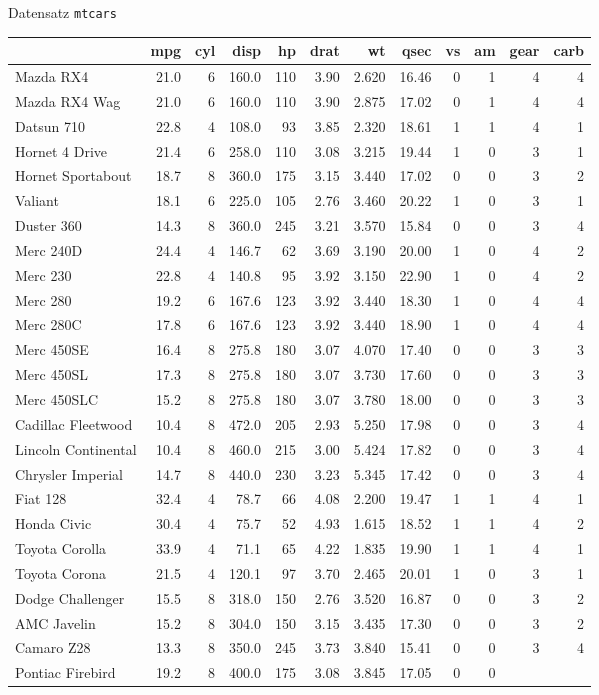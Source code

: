 \documentclass[
  ignorenonframetext,
]{beamer}
\begin{document}
\begin{frame}{Datensatz \texttt{mtcars}}
\protect\hypertarget{datensatz-mtcars}{}

\begin{longtable}[]{@{}lrrrrrrrrrrr@{}}
\toprule
& mpg & cyl & disp & hp & drat & wt & qsec & vs & am & gear &
carb\tabularnewline
\midrule
\endhead
Mazda RX4 & 21.0 & 6 & 160.0 & 110 & 3.90 & 2.620 & 16.46 & 0 & 1 & 4 &
4\tabularnewline
Mazda RX4 Wag & 21.0 & 6 & 160.0 & 110 & 3.90 & 2.875 & 17.02 & 0 & 1 &
4 & 4\tabularnewline
Datsun 710 & 22.8 & 4 & 108.0 & 93 & 3.85 & 2.320 & 18.61 & 1 & 1 & 4 &
1\tabularnewline
Hornet 4 Drive & 21.4 & 6 & 258.0 & 110 & 3.08 & 3.215 & 19.44 & 1 & 0 &
3 & 1\tabularnewline
Hornet Sportabout & 18.7 & 8 & 360.0 & 175 & 3.15 & 3.440 & 17.02 & 0 &
0 & 3 & 2\tabularnewline
Valiant & 18.1 & 6 & 225.0 & 105 & 2.76 & 3.460 & 20.22 & 1 & 0 & 3 &
1\tabularnewline
Duster 360 & 14.3 & 8 & 360.0 & 245 & 3.21 & 3.570 & 15.84 & 0 & 0 & 3 &
4\tabularnewline
Merc 240D & 24.4 & 4 & 146.7 & 62 & 3.69 & 3.190 & 20.00 & 1 & 0 & 4 &
2\tabularnewline
Merc 230 & 22.8 & 4 & 140.8 & 95 & 3.92 & 3.150 & 22.90 & 1 & 0 & 4 &
2\tabularnewline
Merc 280 & 19.2 & 6 & 167.6 & 123 & 3.92 & 3.440 & 18.30 & 1 & 0 & 4 &
4\tabularnewline
Merc 280C & 17.8 & 6 & 167.6 & 123 & 3.92 & 3.440 & 18.90 & 1 & 0 & 4 &
4\tabularnewline
Merc 450SE & 16.4 & 8 & 275.8 & 180 & 3.07 & 4.070 & 17.40 & 0 & 0 & 3 &
3\tabularnewline
Merc 450SL & 17.3 & 8 & 275.8 & 180 & 3.07 & 3.730 & 17.60 & 0 & 0 & 3 &
3\tabularnewline
Merc 450SLC & 15.2 & 8 & 275.8 & 180 & 3.07 & 3.780 & 18.00 & 0 & 0 & 3
& 3\tabularnewline
Cadillac Fleetwood & 10.4 & 8 & 472.0 & 205 & 2.93 & 5.250 & 17.98 & 0 &
0 & 3 & 4\tabularnewline
Lincoln Continental & 10.4 & 8 & 460.0 & 215 & 3.00 & 5.424 & 17.82 & 0
& 0 & 3 & 4\tabularnewline
Chrysler Imperial & 14.7 & 8 & 440.0 & 230 & 3.23 & 5.345 & 17.42 & 0 &
0 & 3 & 4\tabularnewline
Fiat 128 & 32.4 & 4 & 78.7 & 66 & 4.08 & 2.200 & 19.47 & 1 & 1 & 4 &
1\tabularnewline
Honda Civic & 30.4 & 4 & 75.7 & 52 & 4.93 & 1.615 & 18.52 & 1 & 1 & 4 &
2\tabularnewline
Toyota Corolla & 33.9 & 4 & 71.1 & 65 & 4.22 & 1.835 & 19.90 & 1 & 1 & 4
& 1\tabularnewline
Toyota Corona & 21.5 & 4 & 120.1 & 97 & 3.70 & 2.465 & 20.01 & 1 & 0 & 3
& 1\tabularnewline
Dodge Challenger & 15.5 & 8 & 318.0 & 150 & 2.76 & 3.520 & 16.87 & 0 & 0
& 3 & 2\tabularnewline
AMC Javelin & 15.2 & 8 & 304.0 & 150 & 3.15 & 3.435 & 17.30 & 0 & 0 & 3
& 2\tabularnewline
Camaro Z28 & 13.3 & 8 & 350.0 & 245 & 3.73 & 3.840 & 15.41 & 0 & 0 & 3 &
4\tabularnewline
Pontiac Firebird & 19.2 & 8 & 400.0 & 175 & 3.08 & 3.845 & 17.05 & 0 & 0

\end{longtable}
\end{frame}
\end{document}
